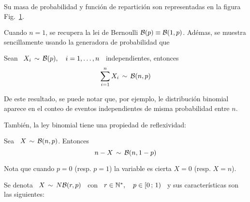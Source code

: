 Su masa  de probabilidad  y funci\'on de  repartici\'on son representadas  en la
figura Fig.~\ref{Fig:MP:Binomial}.
%
\begin{figure}[h!]
\begin{center}  \end{center}
%
\label{Fig:MP:Binomial}
\end{figure}

Cuando  $n  = 1$,  se  recupera  la lei  de  Bernoulli  $\mathcal{B}(p) \equiv  \mathcal{B}(1,p)$.
Ad\'emas, se muestra  sencillamente usando la generadora de  probabilidad que
%
\begin{lema}
\label{Lem:BinomilaSumaBernoulli}
%
  Sean \  $X_i \,  \sim \, \mathcal{B}(p),  \quad i  = 1, \ldots  , n$  \ independientes,
  entonces
  \[
  \sum_{i=1}^n X_i \, \sim \, \mathcal{B}(n,p)
  \]
\end{lema}
%
De este resultado,  se puede notar que, por  ejemplo, le distribuci\'on binomial
aparece en el conteo de eventos independientes de misma probabilidad entre $n$.

Tambi\'en, la ley binomial tiene una propiedad de reflexividad:
%
\begin{lema}[Reflexividad]
\label{Lem:MP:ReflexividadBinomial}
%
  Sea \ $X \, \sim \, \mathcal{B}(n,p)$. Entonces
  \[
  n-X \, \sim \, \mathcal{B}(n,1-p)
  \]
\end{lema}

Nota que cuando $p = 0$ (resp. $p = 1$) la variable es cierta $X = 0$ (resp.  $X
= n$).



\label{Sssec:MP:BinomialNegativa}

Se denota \ $X \, \sim \, N\mathcal{B}(r,p)$ \  con \ $r \in \mathbb{N}^*, \quad p \in [0 \, ;
\, 1)$ \ y sus caracter\'isticas son las siguientes:

